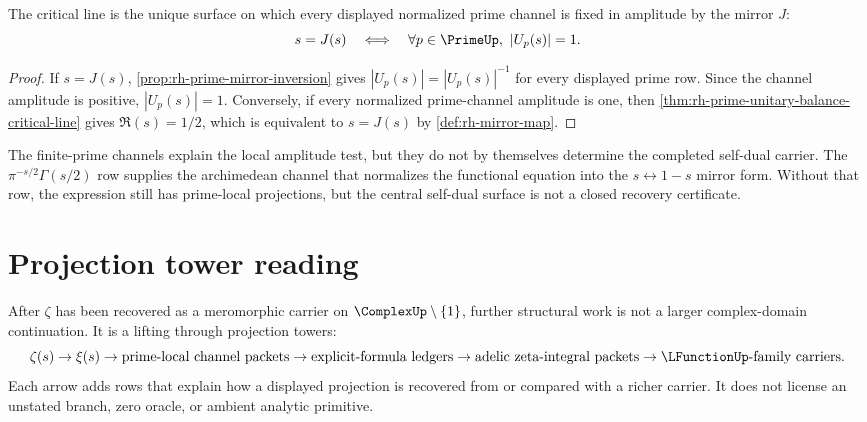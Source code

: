 \begin{corollary}
\label{cor:rh-fixed-mirror-amplitude-surface}
The critical line is the unique surface on which every displayed normalized
prime channel is fixed in amplitude by the mirror $J$:
$$
s=J(s)
\quad\Longleftrightarrow\quad
\forall p\in\PrimeUp,\ \left|U_p(s)\right|=1.
$$
\end{corollary}

\begin{proof}
If $s=J(s)$, \autoref{prop:rh-prime-mirror-inversion} gives
$|U_p(s)|=|U_p(s)|^{-1}$ for every displayed prime row.  Since the channel
amplitude is positive, $|U_p(s)|=1$.  Conversely, if every normalized
prime-channel amplitude is one, then
\autoref{thm:rh-prime-unitary-balance-critical-line} gives
$\Re(s)=1/2$, which is equivalent to $s=J(s)$ by
\autoref{def:rh-mirror-map}.
\end{proof}

\begin{remark}
\label{rem:rh-archimedean-row-role}
The finite-prime channels explain the local amplitude test, but they do not
by themselves determine the completed self-dual carrier.  The
$\pi^{-s/2}\Gamma(s/2)$ row supplies the archimedean channel that normalizes
the functional equation into the $s\leftrightarrow 1-s$ mirror form.  Without
that row, the expression still has prime-local projections, but the central
self-dual surface is not a closed recovery certificate.
\end{remark}

\section{Projection tower reading}
\label{sec:rh-projection-tower-reading}

\begin{principle}
\label{prin:rh-projection-tower-lifting}
After $\zeta$ has been recovered as a meromorphic carrier on
$\ComplexUp\setminus\{1\}$, further structural work is not a larger
complex-domain continuation.  It is a lifting through projection towers:
$$
\zeta(s)
\to
\xi(s)
\to
\text{prime-local channel packets}
\to
\text{explicit-formula ledgers}
\to
\text{adelic zeta-integral packets}
\to
\LFunctionUp\text{-family carriers}.
$$
Each arrow adds rows that explain how a displayed projection is recovered from
or compared with a richer carrier.  It does not license an unstated branch,
zero oracle, or ambient analytic primitive.
\end{principle}

